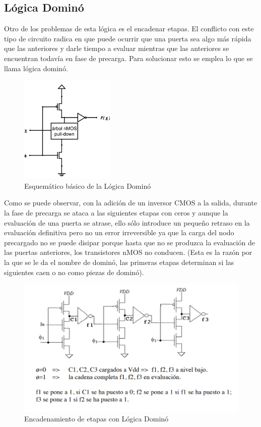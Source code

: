 \subsection{Lógica Dominó}
Otro de los problemas de esta lógica es el encadenar etapas. El conflicto con este tipo de circuito radica en que puede ocurrir que una puerta sea algo más rápida que las anteriores y darle tiempo a evaluar mientras que las anteriores se encuentran todavía en fase de precarga. Para solucionar esto se emplea lo que se llama lógica dominó.
\begin{figure}[H]%
\begin {center}
\includegraphics[width=0.4\textwidth]{figures/DominoBasic.PNG}
\caption{Esquemático básico de la Lógica Dominó}
\label{fig:Dominobasic}
\end {center}
\end{figure}
Como se puede observar, con la adición de un inversor CMOS a la salida, durante la fase de precarga se ataca a las siguientes etapas con ceros y aunque la evaluación de una puerta se atrase, ello sólo introduce un pequeño retraso en la evaluación definitiva pero no un error irreversible ya que la carga del nodo precargado no se puede disipar porque hasta que no se produzca la evaluación de las puertas anteriores, los transistores nMOS no conducen. (Esta es la razón por la que se le da el nombre de dominó, las primeras etapas determinan si las siguientes caen o no como piezas de dominó). 
\begin{figure}[h]%
\begin {center}
\includegraphics[width=1\textwidth]{figures/DominoEnc.PNG}
\caption{Encadenamiento de etapas con Lógica Dominó}
\label{fig:DominoEnc}
\end {center}
\end{figure} \newline
